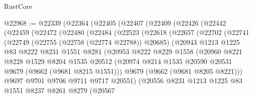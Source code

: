 \begin{lexlean}{RustCore}
\begin{coremodule}
@22968 := @22339
    (@22364
      (@22405
        (@22407
          (@22409
            (@22426
              (@22442
                (@22459
                  (@22472
                    (@22480
                      (@22484
                        (@22523
                          (@22618
                            (@22657
                              (@22702
                                (@22741
                                  (@22749
                                    (@22755 (@22758 (@22774 @22788)) @20685)
                                    (@20943
                                      @1213
                                      @1225
                                      @83
                                      @8222
                                      @8231
                                      @1551
                                      @8281
                                      (@20953
                                        @8222
                                        @8229
                                        @1558
                                        (@20960
                                          @8221
                                          @8228
                                          @1529
                                          @8204
                                          @1535
                                          @20512
                                          (@20974
                                            @8214
                                            @1535
                                            @20590
                                            @20531
                                            @9679
                                            (@9662 (@9681 @8215 @1551)))
                                          @9679
                                          (@9662 (@9681 @8205 @8221)))
                                        @9697
                                        @9701
                                        @9706
                                        @9711
                                        @9717
                                        @20551)
                                      (@20556
                                        @8231
                                        @1213
                                        @1225
                                        @83
                                        @1551
                                        @8237
                                        @8261
                                        @8279
                                        (@20567

\end{coremodule}
\end{lexlean}
